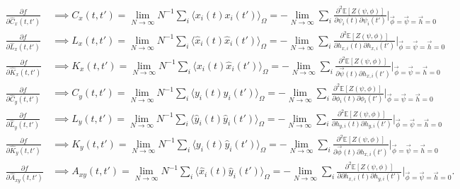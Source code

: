 \documentclass{article}
\begin{document}
\begin{align*}
	\frac{\partial f}{\partial \hat{C}_x(t, t')} &\implies C_x(t, t') = \lim_{N \rightarrow \infty}
N^{-1} \sum_i \langle x_i(t) x_i(t')\rangle _\Omega = -\lim_{N \rightarrow \infty} \sum_i
\frac{\partial^2\mathbb{E}[Z(\psi, \phi)]}{\partial \psi_i(t) \partial \psi_i (t')} \bigg|_{\Vec
{\phi} = \Vec{\psi} = \Vec{h} = 0}\\
	\frac{\partial f}{\partial \hat{L}_x(t, t')} &\implies L_x(t, t') = \lim_{N \rightarrow \infty}
N^{-1} \sum_i \langle \hat{x}_i(t) \hat{x}_i(t')\rangle _\Omega = -\lim_{N \rightarrow \infty} \sum_i
\frac{\partial^2\mathbb{E}[Z(\psi, \phi)]}{\partial h_{x,i}(t) \partial h_{x, i} (t')} \bigg|_{\Vec
{\phi} = \Vec{\psi} = \Vec{h} = 0}\\
	\frac{\partial f}{\partial \hat{K}_x(t, t')} &\implies K_x(t, t') = \lim_{N \rightarrow \infty}
N^{-1} \sum_i \langle x_i(t) \hat{x}_i(t')\rangle _\Omega = -\lim_{N \rightarrow \infty} \sum_i
\frac{\partial^2\mathbb{E}[Z(\psi, \phi)]}{\partial \Vec{\psi}(t) \partial h_{x, i} (t')}
\bigg|_{\Vec{\phi} = \Vec{\psi} = \Vec{h} = 0}\\
\frac{\partial f}{\partial \hat{C}_y(t, t')} &\implies C_y(t, t') = \lim_{N \rightarrow \infty}
N^{-1} \sum_i \langle y_i(t) y_i(t')\rangle _\Omega = -\lim_{N \rightarrow \infty} \sum_i
\frac{\partial^2\mathbb{E}[Z(\psi, \phi)]}{\partial \phi_i(t) \partial \phi_i (t')} \bigg|_{\Vec
{\phi} = \Vec{\psi} = \Vec{h} = 0}\\
	\frac{\partial f}{\partial \hat{L}_y(t, t')} &\implies L_y(t, t') = \lim_{N \rightarrow \infty}
N^{-1} \sum_i \langle \hat{y}_i(t) \hat{y}_i(t')\rangle _\Omega = -\lim_{N \rightarrow \infty} \sum_i
\frac{\partial^2\mathbb{E}[Z(\psi, \phi)]}{\partial h_{y,i}(t) \partial h_{y, i} (t')} \bigg|_{\Vec
{\phi} = \Vec{\psi} = \Vec{h} = 0}\\
	\frac{\partial f}{\partial \hat{K}_y(t, t')} &\implies K_y(t, t') = \lim_{N \rightarrow \infty}
N^{-1} \sum_i \langle y_i(t) \hat{y}_i(t')\rangle _\Omega = -\lim_{N \rightarrow \infty} \sum_i
\frac{\partial^2\mathbb{E}[Z(\psi, \phi)]}{\partial \Vec{\phi}(t) \partial h_{x, i} (t')}
\bigg|_{\Vec{\phi} = \Vec{\psi} = \Vec{h} = 0}\\
	\frac{\partial f}{\partial \hat{A}_{xy}(t, t')} &\implies A_{xy}(t, t') = \lim_{N \rightarrow
	\infty}
N^{-1} \sum_i \langle \hat{x}_i(t) \hat{y}_i(t')\rangle _\Omega = -\lim_{N \rightarrow \infty} \sum_i
\frac{\partial^2\mathbb{E}[Z(\psi, \phi)]}{\partial \partial h_{x, i} (t) \partial h_{y, i} (t')}
\bigg|_{\Vec{\phi} = \Vec{\psi} = \Vec{h} = 0}.\\
\end{align*}
\end{document}
